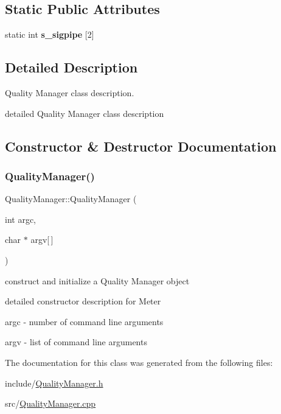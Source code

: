 \subsection*{Static Public Attributes}
\begin{DoxyCompactItemize}
\item 
\mbox{\label{classQualityManager_abf272ec740cc8baa0befd02755c49bce}} 
static int {\bfseries s\+\_\+sigpipe} \mbox{[}2\mbox{]}
\end{DoxyCompactItemize}


\subsection{Detailed Description}
Quality Manager class description. 

detailed Quality Manager class description 

\subsection{Constructor \& Destructor Documentation}
\mbox{\label{classQualityManager_a0ac2ca4170c2b202b06501dc1be517ee}} 
\subsubsection{\texorpdfstring{Quality\+Manager()}{QualityManager()}}
{\footnotesize\ttfamily Quality\+Manager\+::\+Quality\+Manager (\begin{DoxyParamCaption}\item[{int}]{argc,  }\item[{char $\ast$}]{argv\mbox{[}$\,$\mbox{]} }\end{DoxyParamCaption})}



construct and initialize a Quality Manager object 

detailed constructor description for Meter

\begin{DoxyItemize}
\item {\ttfamily argc} -\/ number of command line arguments \item {\ttfamily argv} -\/ list of command line arguments \end{DoxyItemize}


The documentation for this class was generated from the following files\+:\begin{DoxyCompactItemize}
\item 
include/\hyperlink{QualityManager_8h}{Quality\+Manager.\+h}\item 
src/\hyperlink{QualityManager_8cpp}{Quality\+Manager.\+cpp}\end{DoxyCompactItemize}
